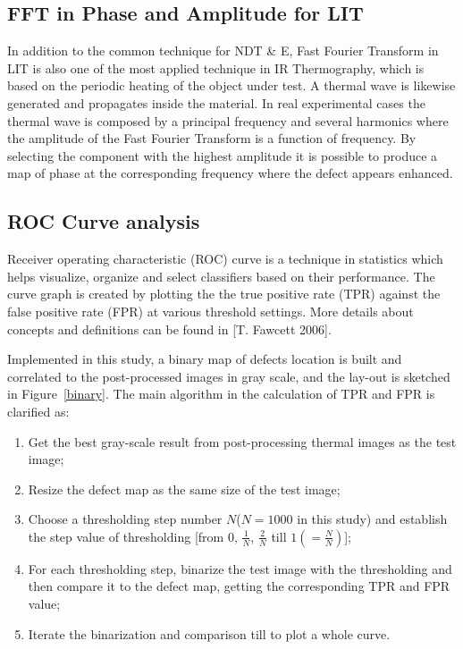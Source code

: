 \documentclass[]{spie}  %
\begin{document}
\subsection{FFT in Phase and Amplitude for LIT}
In addition to the common technique for NDT \& E, Fast Fourier Transform in LIT\cite{wu1998lock} is also one of the most applied technique in IR Thermography, which is based on the periodic heating of the object under test. A thermal wave is likewise generated and propagates inside the material. In real experimental cases the thermal wave is composed by a principal frequency and several harmonics where the amplitude of the Fast Fourier Transform is a function of frequency. By selecting the component with the highest amplitude it is possible to produce a map of phase at the corresponding frequency where the defect appears enhanced.


\subsection{ROC Curve analysis} %
\label{sub:roc_curve_analysis}
Receiver operating characteristic (ROC) curve is a technique in statistics which helps visualize, organize and select classifiers based on their performance. The curve graph is created by plotting the the true positive rate (TPR) against the false positive rate (FPR) at various threshold settings. More details about concepts and definitions can be found in [T. Fawcett 2006]\cite{Fawcett2006}.

Implemented in this study, a binary map of defects location is built and correlated to the post-processed images in gray scale, and the lay-out is sketched in Figure~\ref{binary}. The main algorithm in the calculation of TPR and FPR is clarified as:
\begin{enumerate}
   \item Get the best gray-scale result from post-processing thermal images as the test image;
   \item Resize the defect map as the same size of the test image;
   \item Choose a thresholding step number $N$($N=1000$ in this study) and establish the step value of thresholding [from $0$, $\frac{1}{N}$, $\frac{2}{N}$ till $1 (=\frac{N}{N})$];
   \item For each thresholding step, binarize the test image with the thresholding and then compare it to the defect map, getting the corresponding TPR and FPR value;
   \item Iterate the binarization and comparison till to plot a whole curve.
\end{enumerate}
\end{document}
